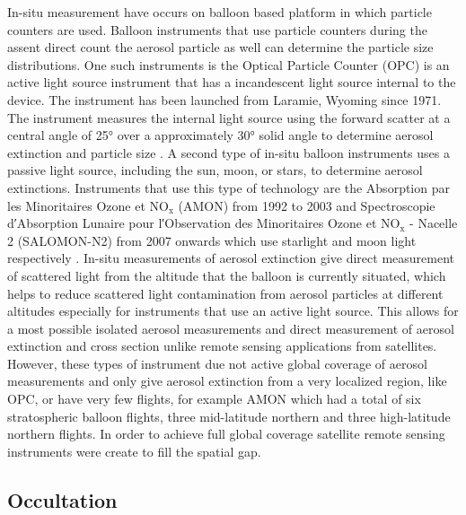 In-situ measurement have occurs on balloon based platform in which particle counters are used. Balloon instruments that use particle counters during the assent direct count the aerosol particle as well can determine the particle size distributions. One such instruments is the Optical Particle Counter (OPC) is an active light source instrument that has a incandescent light source internal to the device. The instrument has been launched from Laramie, Wyoming since 1971. The instrument measures the internal light source using the forward scatter at a central angle of 25\si{\degree} over a approximately 30\si{\degree} solid angle to determine aerosol extinction and particle size \citep{Rosen1964, Deshler2003}. A second type of in-situ balloon instruments uses a passive light source, including the sun, moon, or stars, to determine aerosol extinctions. Instruments that use this type of technology are the Absorption par les Minoritaires Ozone et $\text{NO}_{\text{x}}$ (AMON) from 1992 to 2003 and Spectroscopie d\si{\arcminute}Absorption Lunaire pour l\si{\arcminute}Observation des Minoritaires Ozone et $\text{NO}_{\text{x}}$ - Nacelle 2 (SALOMON-N2) from 2007 onwards which use starlight and moon light respectively \citep{Berthet2002}. In-situ measurements of aerosol extinction give direct measurement of scattered light from the altitude that the balloon is currently situated, which helps to reduce scattered light contamination from aerosol particles at different altitudes especially for instruments that use an active light source. This allows for a most possible isolated aerosol measurements  and direct measurement of aerosol extinction and cross section unlike remote sensing applications from satellites. However, these types of instrument due not active global coverage of aerosol measurements and only give aerosol extinction from a very localized region, like OPC, or have very few flights, for example AMON which had a total of six stratospheric balloon flights, three mid-latitude northern and three high-latitude northern flights. In order to achieve full global coverage satellite remote sensing instruments were create to fill the spatial gap.

\subsection{Occultation}

